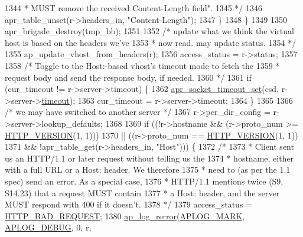 \begin{DoxyCode}
{{1344 \textcolor{comment}{             * MUST remove the received Content-Length field".}
1345 \textcolor{comment}{             */}
1346             apr\_table\_unset(r->headers\_in, \textcolor{stringliteral}{"Content-Length"});
1347         \}
1348     \}
1349 
1350     apr\_brigade\_destroy(tmp\_bb);
1351 
1352     \textcolor{comment}{/* update what we think the virtual host is based on the headers we've}
1353 \textcolor{comment}{     * now read. may update status.}
1354 \textcolor{comment}{     */}
1355     ap\_update\_vhost\_from\_headers(r);
1356     access\_status = r->status;
1357 
1358     \textcolor{comment}{/* Toggle to the Host:-based vhost's timeout mode to fetch the}
1359 \textcolor{comment}{     * request body and send the response body, if needed.}
1360 \textcolor{comment}{     */}
1361     \textcolor{keywordflow}{if} (cur\_timeout != r->server->timeout) \{
1362         \hyperlink{unix_2sockopt_8c_a945bdbe807ec5635d65a6fd9ddb78c29}{apr\_socket\_timeout\_set}(csd, r->server->\hyperlink{structapr__socket__t_a3626689cdb39190d306a43cbd7f9e90c}{timeout});
1363         cur\_timeout = r->server->timeout;
1364     \}
1365 
1366     \textcolor{comment}{/* we may have switched to another server */}
1367     r->per\_dir\_config = r->server->lookup\_defaults;
1368 
1369     \textcolor{keywordflow}{if} ((!r->hostname && (r->proto\_num >= \hyperlink{group__APACHE__CORE__DAEMON_gab48aba3b8935a26d38b88710041a1b6a}{HTTP\_VERSION}(1, 1)))
1370         || ((r->proto\_num == \hyperlink{group__APACHE__CORE__DAEMON_gab48aba3b8935a26d38b88710041a1b6a}{HTTP\_VERSION}(1, 1))
1371             && !apr\_table\_get(r->headers\_in, \textcolor{stringliteral}{"Host"}))) \{
1372         \textcolor{comment}{/*}
1373 \textcolor{comment}{         * Client sent us an HTTP/1.1 or later request without telling us the}
1374 \textcolor{comment}{         * hostname, either with a full URL or a Host: header. We therefore}
1375 \textcolor{comment}{         * need to (as per the 1.1 spec) send an error.  As a special case,}
1376 \textcolor{comment}{         * HTTP/1.1 mentions twice (S9, S14.23) that a request MUST contain}
1377 \textcolor{comment}{         * a Host: header, and the server MUST respond with 400 if it doesn't.}
1378 \textcolor{comment}{         */}
1379         access\_status = \hyperlink{group__HTTP__Status_ga0c1fdbbb10800664989907cbd3a5a023}{HTTP\_BAD\_REQUEST};
1380         \hyperlink{group__APACHE__CORE__LOG_ga4c112558ccffd6b363da102b2052d2a6}{ap\_log\_rerror}(\hyperlink{group__APACHE__CORE__LOG_ga655e126996849bcb82e4e5a14c616f4a}{APLOG\_MARK}, \hyperlink{group__APACHE__CORE__LOG_gadfcef90537539cf2b7d35cfbbbafeb93}{APLOG\_DEBUG}, 0, r, 
}}
\end{DoxyCode}

